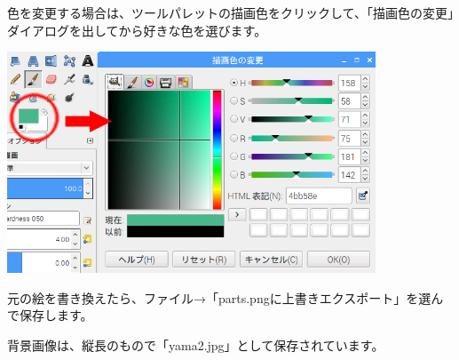 \documentclass[a4paper,dvipdfmx]{jarticle}
\begin{document}
\bigskip

色を変更する場合は、ツールパレットの描画色をクリックして、「描画色の変更」ダイアログを出してから好きな色を選びます。


\bigskip



\begin{center}
\includegraphics[width=10.993cm,height=6.588cm]{text04-img/text04-img031.png}

\end{center}

\bigskip


\bigskip


\bigskip


\bigskip


\bigskip


\bigskip


\bigskip

元の絵を書き換えたら、ファイル→「parts.pngに上書きエクスポート」を選んで保存します。


\bigskip

背景画像は、縦長のもので「yama2.jpg」として保存されています。


\bigskip


\bigskip


\bigskip


\bigskip


\bigskip


\bigskip


\bigskip


\bigskip


\bigskip


\bigskip


\bigskip


\bigskip


\bigskip


\bigskip


\bigskip
\end{document}
